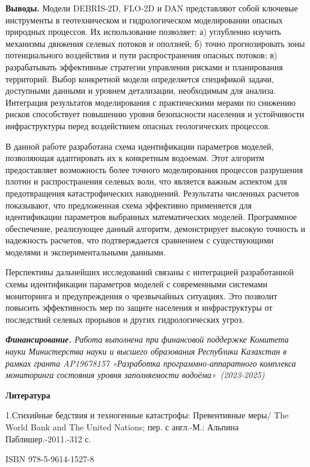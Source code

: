 {\bfseries Выводы.} Модели DEBRIS-2D, FLO-2D и DAN представляют собой
ключевые инструменты в геотехническом и гидрологическом моделировании
опасных природных процессов. Их использование позволяет: а) углубленно
изучить механизмы движения селевых потоков и оползней; б) точно
прогнозировать зоны потенциального воздействия и пути распространения
опасных потоков; в) разрабатывать эффективные стратегии управления
рисками и планирования территорий. Выбор конкретной модели определяется
спецификой задачи, доступными данными и уровнем детализации, необходимым
для анализа. Интеграция результатов моделирования с практическими мерами
по снижению рисков способствует повышению уровня безопасности населения
и устойчивости инфраструктуры перед воздействием опасных геологических
процессов.

В данной работе разработана схема идентификации параметров моделей,
позволяющая адаптировать их к конкретным водоемам. Этот алгоритм
предоставляет возможность более точного моделирования процессов
разрушения плотин и распространения селевых волн, что является важным
аспектом для предотвращения катастрофических наводнений. Результаты
численных расчетов показывают, что предложенная схема эффективно
применяется для идентификации параметров выбранных математических
моделей. Программное обеспечение, реализующее данный алгоритм,
демонстрирует высокую точность и надежность расчетов, что подтверждается
сравнением с существующими моделями и экспериментальными данными.

Перспективы дальнейших исследований связаны с интеграцией разработанной
схемы идентификации параметров моделей с современными системами
мониторинга и предупреждения о чрезвычайных ситуациях. Это позволит
повысить эффективность мер по защите населения и инфраструктуры от
последствий селевых прорывов и других гидрологических угроз.

\emph{{\bfseries Финансирование.} Работа выполнена при финансовой поддержке
Комитета науки Министерства науки и высшего образования Республики
Казахстан в рамках гранта AP19678157 «Разработка программно-аппаратного
комплекса мониторинга состояния уровня заполняемости
водоёма»~(2023-2025)}

{\bfseries Литература}

1.Стихийные бедствия и техногенные катастрофы: Превентивные меры/ The
World Bank and The United Nations; пер. с англ.-М.: Альпина
Паблишер.-2011.-312 с.

ISBN 978-5-9614-1527-8

